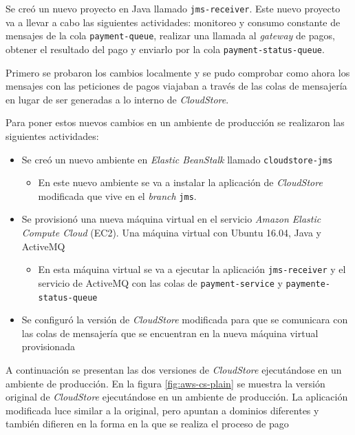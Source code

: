 \documentclass[article]{IEEEtran}
\begin{document}
Se creó un nuevo proyecto en Java llamado \texttt{jms-receiver}. Este nuevo proyecto va a llevar a cabo las siguientes actividades: monitoreo y consumo constante de mensajes de la cola \texttt{payment-queue}, realizar una llamada al \emph{gateway} de pagos, obtener el resultado del pago y enviarlo por la cola \texttt{payment-status-queue}.

Primero se probaron los cambios localmente y se pudo comprobar como ahora los mensajes con las peticiones de pagos viajaban a través de las colas de mensajería en lugar de ser generadas a lo interno de \emph{CloudStore}.

Para poner estos nuevos cambios en un ambiente de producción se realizaron las siguientes actividades:
\begin{itemize}
    \item Se creó un nuevo ambiente en \emph{Elastic BeanStalk} llamado \texttt{cloudstore-jms}
    \begin{itemize}
        \item En este nuevo ambiente se va a instalar la aplicación de \emph{CloudStore} modificada que vive en el \emph{branch} \texttt{jms}.
    \end{itemize}

    \item Se provisionó una nueva máquina virtual en el servicio \emph{Amazon Elastic Compute Cloud} (EC2). Una máquina virtual con Ubuntu 16.04, Java y ActiveMQ
    \begin{itemize}
        \item En esta máquina virtual se va a ejecutar la aplicación \texttt{jms-receiver} y el servicio de ActiveMQ con las colas de \texttt{payment-service} y \texttt{paymente-status-queue}
    \end{itemize}
    \item Se configuró la versión de \emph{CloudStore} modificada para que se comunicara con las colas de mensajería que se encuentran en la nueva máquina virtual provisionada
\end{itemize}

A continuación se presentan las dos versiones de \emph{CloudStore} ejecutándose en un ambiente de producción. En la figura \ref{fig:aws-cs-plain} se muestra la versión original de \emph{CloudStore} ejecutándose en un ambiente de producción. La aplicación modificada luce similar a la original, pero apuntan a dominios diferentes y también difieren en la forma en la que se realiza el proceso de pago
\end{document}
